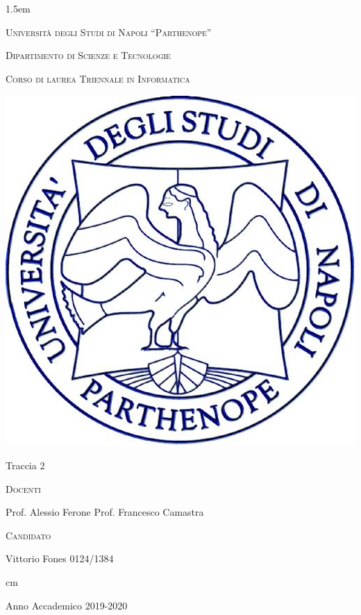 \documentclass[12pt,italian,a4paper,oneside,openright]{article}
\begin{document}
\baselineskip 1.5em

{\thispagestyle{ empty }

\vskip 1cm \large \centerline{\textsc{Universit\`a degli Studi di
Napoli ``Parthenope''}}

\centerline {\textsc{Dipartimento di Scienze e Tecnologie}}

\centerline {\small\textsc{Corso di laurea Triennale in Informatica}}

\begin{center}
\includegraphics[scale=0.5]{logo_parthenope.png}
\end{center}

\vskip 0.5cm

\large {}

\vskip 0.5cm

\Large \centerline {Traccia 2}


\vskip 4.5cm


\large
\begin{minipage}[t]{7cm}
\textsc{Docenti}

Prof. Alessio Ferone\newline
Prof. Francesco Camastra

\end{minipage}
\hfill
\begin{minipage}[t]{6cm}
\hfill \textsc{Candidato}

\hfill Vittorio Fones 0124/1384
\end{minipage}

 cm \Large \centerline {Anno Accademico 2019-2020}
\vfill \eject}
\end{document}
